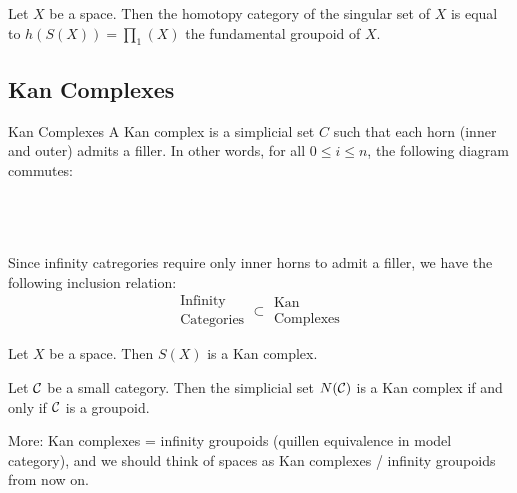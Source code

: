 \documentclass[a4paper]{article}
\begin{document}
\begin{prp}{}{} Let $X$ be a space. Then the homotopy category of the singular set of $X$ is equal to $h(S(X))=\prod_1(X)$ the fundamental groupoid of $X$. 
\end{prp}

\subsection{Kan Complexes}
\begin{defn}{Kan Complexes}{} A Kan complex is a simplicial set $C$ such that each horn (inner and outer) admits a filler. In other words, for all $0\leq i\leq n$, the following diagram commutes: \\~\\
\\~\\
\end{defn}

Since infinity catregories require only inner horns to admit a filler, we have the following inclusion relation: $$\substack{\text{Infinity}\\\text{Categories}}\subset\substack{\text{Kan}\\\text{Complexes}}$$

\begin{prp}{}{} Let $X$ be a space. Then $S(X)$ is a Kan complex. 
\end{prp}

\begin{thm}{}{} Let $\mathcal{C}$ be a small category. Then the simplicial set $N(\mathcal{C})$ is a Kan complex if and only if $\mathcal{C}$ is a groupoid. 
\end{thm}

More: Kan complexes = infinity groupoids (quillen equivalence in model category), and we should think of spaces as Kan complexes / infinity groupoids from now on. 
\end{document}
